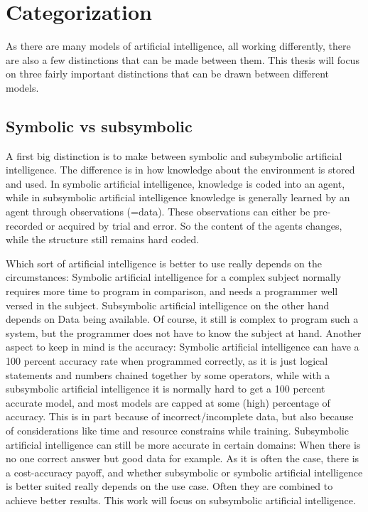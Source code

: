 \chapter{Categorization}
\label{sec:categorization}
As there are many models of artificial intelligence, all working differently, there are also a few distinctions that can be made between them. This thesis will focus on three fairly important distinctions that can be drawn between different models.
\section{Symbolic vs subsymbolic} \label{sec:categorization:symbolicvssub} \cite{SymbolicVsSubsymbolic}
A first big distinction is to make between symbolic and subsymbolic artificial intelligence. 
The difference is in how knowledge about the environment is stored and used.
In symbolic artificial intelligence, knowledge is coded into an agent, while in subsymbolic artificial intelligence knowledge is generally learned by an agent through observations (=data). These observations can either be pre-recorded or acquired by trial and error. So the content of the agents changes, while the structure still remains hard coded.

Which sort of artificial intelligence is better to use really depends on the circumstances: 
Symbolic artificial intelligence for a complex subject normally requires more time to program in comparison, and needs a programmer well versed in the subject. 
Subsymbolic artificial intelligence on the other hand depends on Data being available. Of course, it still is complex to program such a system, but the programmer does not have to know the subject at hand. %
Another aspect to keep in mind is the accuracy: Symbolic artificial intelligence can have a 100 percent accuracy rate when programmed correctly, as it is just logical statements and numbers chained together by some operators, while with a subsymbolic artificial intelligence it is normally hard to get a 100 percent accurate model, and most models are capped at some (high) percentage of accuracy. This is in part because of incorrect/incomplete data, but also because of considerations like time and resource constrains while training. Subsymbolic artificial intelligence can still be more accurate in certain domains: When there is no one correct answer but good data for example.
As it is often the case, there is a cost-accuracy payoff, and whether subsymbolic or symbolic artificial intelligence is better suited really depends on the use case. Often they are combined to achieve better results. This work will focus on subsymbolic artificial intelligence. 

